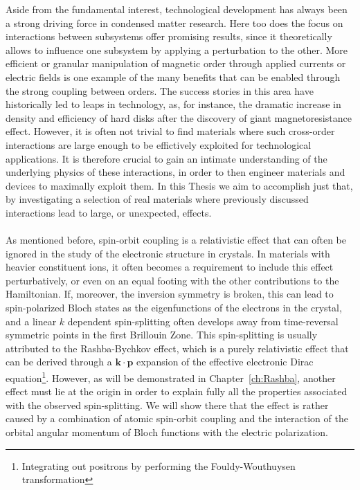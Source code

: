 Aside from the fundamental interest, technological development has always been a strong driving force in condensed matter research. Here too does the focus on interactions between subsystems offer promising results, since it theoretically allows to influence one subsystem by applying a perturbation to the other.
More efficient or granular manipulation of magnetic order through applied currents or electric fields is one example of the many benefits that can be enabled through the strong coupling between orders.
The success stories in this area have historically led to leaps in technology, as, for instance, the dramatic increase in density and efficiency of hard disks after the discovery of giant magnetoresistance effect.
However, it is often not trivial to find materials where such cross-order interactions are large enough to be effictively exploited for technological applications.
It is therefore crucial to gain an intimate understanding of the underlying physics of these interactions, in order to then engineer materials and devices to maximally exploit them.
In this Thesis we aim to accomplish just that, by investigating a selection of real materials where previously discussed interactions lead to large, or unexpected, effects.
\\\\
As mentioned before, spin-orbit coupling is a relativistic effect that can often be ignored in the study of the electronic structure in crystals.
In materials with heavier constituent ions, it often becomes a requirement to include this effect perturbatively, or even on an equal footing with the other contributions to the Hamiltonian.
If, moreover, the inversion symmetry is broken, this can lead to spin-polarized Bloch states as the eigenfunctions of the electrons in the crystal, and a linear $k$ dependent spin-splitting often develops away from time-reversal symmetric points in the first Brillouin Zone.
This spin-splitting is usually attributed to the Rashba-Bychkov effect, which is a purely relativistic effect that can be derived through a $\bm{k}\cdot \bm{p}$ expansion of the effective electronic Dirac equation\footnote{Integrating out positrons by performing the Fouldy-Wouthuysen transformation}.
However, as will be demonstrated in Chapter~\ref{ch:Rashba}, another effect must lie at the origin in order to explain fully all the properties associated with the observed spin-splitting.
We will show there that the effect is rather caused by a combination of atomic spin-orbit coupling and the interaction of the orbital angular momentum of Bloch functions with the electric polarization.
